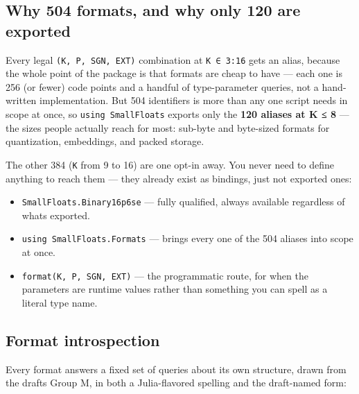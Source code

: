 \subsection{Why 504 formats, and why only 120 are exported}



\label{9834957682784680318}{}


Every legal \texttt{(K, P, SGN, EXT)} combination at \texttt{K ∈ 3:16} gets an alias, because the whole point of the package is that formats are cheap to have — each one is 256 (or fewer) code points and a handful of type-parameter queries, not a hand-written implementation. But 504 identifiers is more than any one script needs in scope at once, so \texttt{using SmallFloats} exports only the \textbf{120 aliases at K ≤ 8} — the sizes people actually reach for most: sub-byte and byte-sized formats for quantization, embeddings, and packed storage.



The other 384 (\texttt{K} from 9 to 16) are one opt-in away. You never need to define anything to reach them — they already exist as bindings, just not exported ones:



\begin{itemize}
\item \texttt{SmallFloats.Binary16p6se} — fully qualified, always available regardless of what{\textquotesingle}s exported.


\item \texttt{using SmallFloats.Formats} — brings every one of the 504 aliases into scope at once.


\item \texttt{format(K, P, SGN, EXT)} — the programmatic route, for when the parameters are runtime values rather than something you can spell as a literal type name.

\end{itemize}


\subsection{Format introspection}



\label{7504779454545473321}{}


Every format answers a fixed set of queries about its own structure, drawn from the draft{\textquotesingle}s Group M, in both a Julia-flavored spelling and the draft-named form:




